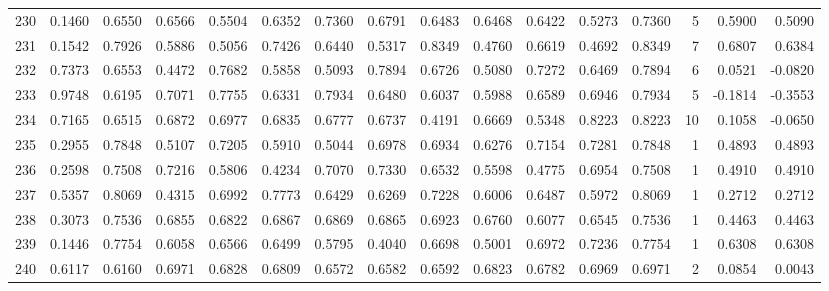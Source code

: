\begin{tabular}{lrrrrrrrrrrrrrrr}
230 &      0.1460 &  0.6550 &  0.6566 &  0.5504 &  0.6352 &  0.7360 &  0.6791 &  0.6483 &  0.6468 &  0.6422 &   0.5273 &     0.7360 &      5 &                    0.5900 &                     0.5090 \\
231 &      0.1542 &  0.7926 &  0.5886 &  0.5056 &  0.7426 &  0.6440 &  0.5317 &  0.8349 &  0.4760 &  0.6619 &   0.4692 &     0.8349 &      7 &                    0.6807 &                     0.6384 \\
232 &      0.7373 &  0.6553 &  0.4472 &  0.7682 &  0.5858 &  0.5093 &  0.7894 &  0.6726 &  0.5080 &  0.7272 &   0.6469 &     0.7894 &      6 &                    0.0521 &                    -0.0820 \\
233 &      0.9748 &  0.6195 &  0.7071 &  0.7755 &  0.6331 &  0.7934 &  0.6480 &  0.6037 &  0.5988 &  0.6589 &   0.6946 &     0.7934 &      5 &                   -0.1814 &                    -0.3553 \\
234 &      0.7165 &  0.6515 &  0.6872 &  0.6977 &  0.6835 &  0.6777 &  0.6737 &  0.4191 &  0.6669 &  0.5348 &   0.8223 &     0.8223 &     10 &                    0.1058 &                    -0.0650 \\
235 &      0.2955 &  0.7848 &  0.5107 &  0.7205 &  0.5910 &  0.5044 &  0.6978 &  0.6934 &  0.6276 &  0.7154 &   0.7281 &     0.7848 &      1 &                    0.4893 &                     0.4893 \\
236 &      0.2598 &  0.7508 &  0.7216 &  0.5806 &  0.4234 &  0.7070 &  0.7330 &  0.6532 &  0.5598 &  0.4775 &   0.6954 &     0.7508 &      1 &                    0.4910 &                     0.4910 \\
237 &      0.5357 &  0.8069 &  0.4315 &  0.6992 &  0.7773 &  0.6429 &  0.6269 &  0.7228 &  0.6006 &  0.6487 &   0.5972 &     0.8069 &      1 &                    0.2712 &                     0.2712 \\
238 &      0.3073 &  0.7536 &  0.6855 &  0.6822 &  0.6867 &  0.6869 &  0.6865 &  0.6923 &  0.6760 &  0.6077 &   0.6545 &     0.7536 &      1 &                    0.4463 &                     0.4463 \\
239 &      0.1446 &  0.7754 &  0.6058 &  0.6566 &  0.6499 &  0.5795 &  0.4040 &  0.6698 &  0.5001 &  0.6972 &   0.7236 &     0.7754 &      1 &                    0.6308 &                     0.6308 \\
240 &      0.6117 &  0.6160 &  0.6971 &  0.6828 &  0.6809 &  0.6572 &  0.6582 &  0.6592 &  0.6823 &  0.6782 &   0.6969 &     0.6971 &      2 &                    0.0854 &                     0.0043 \\

\end{tabular}
